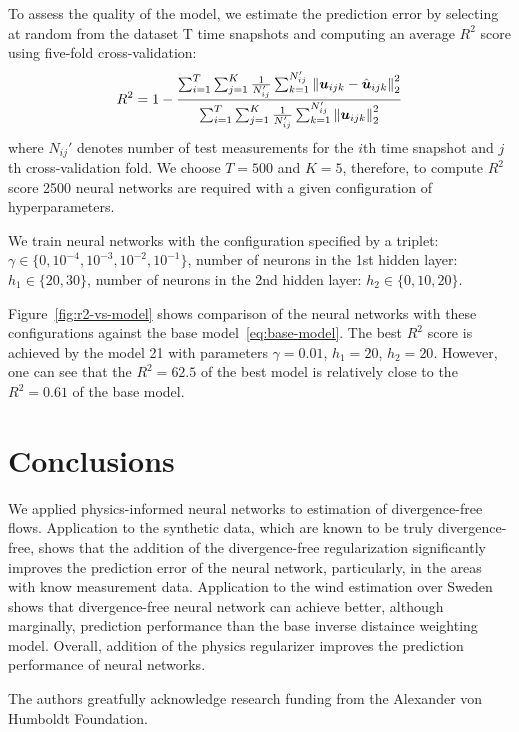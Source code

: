 \documentclass[pamm,a4paper,fleqn]{w-art}
\renewcommand{\vec}[1]{\boldsymbol{#1}}
\newcommand{\norm}[1]{\left\lVert#1\right\rVert}
\begin{document}
To assess the quality of the model, we estimate the prediction error
by selecting at random from the dataset T time snapshots and computing
an average $R^2$ score using five-fold cross-validation:
\[
  R^2 = 1 - \frac{%
    \sum_{i=1}^T \sum_{j=1}^K \frac{1}{N_{ij}'}
    \sum_{k=1}^{N_{ij}'} \norm{\vec{u}_{ijk} - \hat{\vec{u}}_{ijk}}^2_2}
  {%
    \sum_{i=1}^T \sum_{j=1}^K \frac{1}{N_{ij}'}
    \sum_{k=1}^{N_{ij}'} \norm{\vec{u}_{ijk}}^2_2}
\]
where $N_{ij}'$ denotes number of test measurements for the $i$th time snapshot
and $j$th cross-validation fold.
We choose $T=500$ and $K=5$, therefore, to compute $R^2$ score 2500 neural
networks are required with a given configuration of hyperparameters.

We train neural networks with the configuration specified by a triplet: 
$\gamma \in \{0, 10^{-4}, 10^{-3}, 10^{-2}, 10^{-1}\}$, 
number of neurons in the 1st hidden layer: $h_1 \in \{20, 30\}$,
number of neurons in the 2nd hidden layer: $h_2 \in \{0, 10, 20\}$.

Figure~\ref{fig:r2-vs-model} shows comparison of the neural networks with these
configurations against the base model~\eqref{eq:base-model}.
The best $R^2$ score is achieved by the model 21 with parameters $\gamma=0.01$,
$h_1=20$, $h_2=20$.
However, one can see that the $R^2=62.5$ of the best model is relatively close
to the $R^2=0.61$ of the base model.

\section{Conclusions}

We applied physics-informed neural networks to estimation of divergence-free
flows.
Application to the synthetic data, which are known to be truly divergence-free,
shows that the addition of the divergence-free regularization significantly
improves the prediction error of the neural network, particularly, in the areas
with know measurement data.
Application to the wind estimation over Sweden shows that divergence-free neural
network can achieve better, although marginally, prediction performance than
the base inverse distaince weighting model.
Overall, addition of the physics regularizer improves the prediction performance
of neural networks.

\begin{acknowledgement}
  The authors greatfully acknowledge research funding from the Alexander von
  Humboldt Foundation.
\end{acknowledgement}
\end{document}
